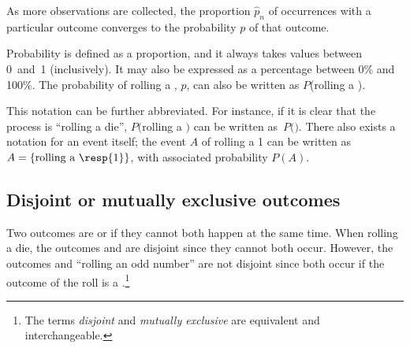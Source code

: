 \begin{termBox}{
As more observations are collected, the proportion $\hat{p}_n$ of occurrences with a particular outcome converges to the probability $p$ of that outcome.}
\end{termBox}


Probability is defined as a proportion, and it always takes values between 0~and~1 (inclusively). It may also be expressed as a percentage between 0\% and 100\%. The probability of rolling a , $p$, can also be written as $P$(rolling a ).

This notation can be further abbreviated. For instance, if it is clear that the process is ``rolling a die'', $P($rolling a $)$ can be written as~$P($$)$.  There also exists a notation for an event itself; the event $A$ of rolling a 1 can be written as $A = \{\text{rolling a \resp{1}}\}$, with associated probability $P(A)$. 


\subsection{Disjoint or mutually exclusive outcomes}


Two outcomes are  or  if they cannot both happen at the same time. When rolling a die, the outcomes  and  are disjoint since they cannot both occur.  However, the outcomes  and ``rolling an odd number'' are not disjoint since both occur if the outcome of the roll is a .\footnote{The terms \emph{disjoint} and \emph{mutually exclusive} are equivalent and interchangeable.} 

